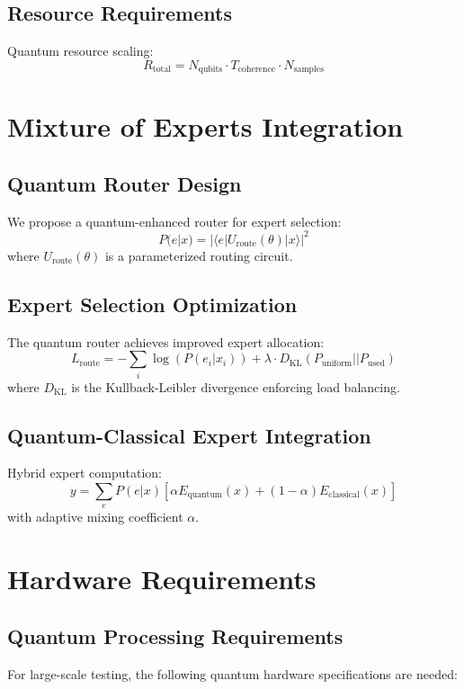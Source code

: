 \documentclass{article}
\begin{document}
\subsection{Resource Requirements}
Quantum resource scaling:
\begin{equation}
R_{\text{total}} = N_{\text{qubits}} \cdot T_{\text{coherence}} \cdot N_{\text{samples}}
\end{equation}

\section{Mixture of Experts Integration}

\subsection{Quantum Router Design}
We propose a quantum-enhanced router for expert selection:
\begin{equation}
P(e|x) = |\langle e|U_{\text{route}}(\theta)|x\rangle|^2
\end{equation}
where $U_{\text{route}}(\theta)$ is a parameterized routing circuit.

\subsection{Expert Selection Optimization}
The quantum router achieves improved expert allocation:
\begin{equation}
L_{\text{route}} = -\sum_i \log(P(e_i|x_i)) + \lambda \cdot D_{\text{KL}}(P_{\text{uniform}}||P_{\text{used}})
\end{equation}
where $D_{\text{KL}}$ is the Kullback-Leibler divergence enforcing load balancing.

\subsection{Quantum-Classical Expert Integration}
Hybrid expert computation:
\begin{equation}
y = \sum_e P(e|x)[\alpha E_{\text{quantum}}(x) + (1-\alpha)E_{\text{classical}}(x)]
\end{equation}
with adaptive mixing coefficient $\alpha$.

\section{Hardware Requirements}

\subsection{Quantum Processing Requirements}
For large-scale testing, the following quantum hardware specifications are needed:
\end{document}
